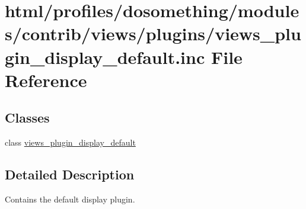 \hypertarget{views__plugin__display__default_8inc}{
\section{html/profiles/dosomething/modules/contrib/views/plugins/views\_\-plugin\_\-display\_\-default.inc File Reference}
\label{views__plugin__display__default_8inc}
}
\subsection*{Classes}
\begin{DoxyCompactItemize}
\item 
class \hyperlink{classviews__plugin__display__default}{views\_\-plugin\_\-display\_\-default}
\end{DoxyCompactItemize}


\subsection{Detailed Description}
Contains the default display plugin. 